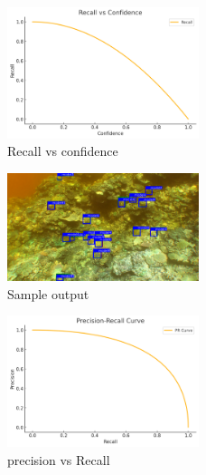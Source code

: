 \documentclass[conference]{IEEEtran}
\begin{document}


\begin{figure}[H]
    \centering
    \includegraphics[width=0.5\textwidth]{R-VS-C.png} 
    \caption{Recall vs confidence}
    \label{fig:metadata-schema}
\end{figure}
\begin{figure}[H]
    \centering
    \includegraphics[width=0.5\textwidth]{oupupt-2.png} 
    \caption{Sample output}
    \label{fig:metadata-schema}
\end{figure}
\begin{figure}[H]
    \centering
    \includegraphics[width=0.5\textwidth]{P-VS-R.png} 
    \caption{precision vs Recall}
    \label{fig:metadata-schema}
\end{figure}
\end{document}
